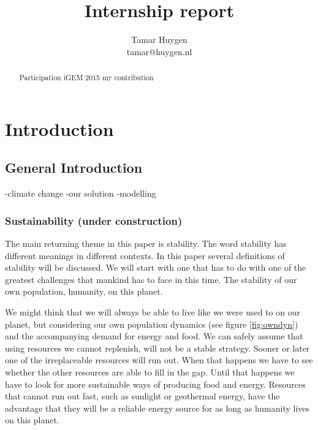 \documentclass[12pt]{report}
\title{Internship report}
\author{Tamar Huygen \\ tamar@huygen.nl}
\begin{document}
\maketitle

\begin{abstract}
  Participation iGEM 2015 my contribution
\end{abstract}

\chapter{Introduction}

\section*{General Introduction}


-climate change
-our solution
-modelling

\subsection{Sustainability (under construction)}\label{sec:sus}
The main returning theme in this paper is stability. The word stability has 
different meanings in different contexts. In this paper several definitions of 
stability will be discussed. We will start with one that has to do with one of 
the greatest challenges that mankind has to face in this time. The stability of 
our own population, humanity, on this planet.

We might think that we will always be able to live like we were used to on our 
planet, but considering our own population dynamics (see figure 
\ref{fig:owndyn}) and the accompanying demand for energy and food. We can safely 
assume that using resources we cannot replenish, will not be a stable strategy. 
Sooner or later one of the irreplaceable resources will run out. When that 
happens we have to see whether the other resources are able to fill in the gap. 
Until that happens we have to look for more sustainable ways of producing food 
and energy. Resources that cannot run out fast, such as sunlight or geothermal 
energy, have the advantage that they will be a reliable energy source for as 
long as humanity lives on this planet.
\end{document}
